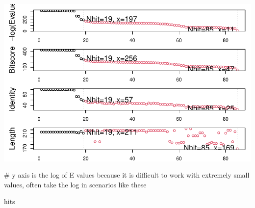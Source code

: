 \documentclass[
  letterpaper,
  DIV=11,
  numbers=noendperiod]{scrartcl}
\newenvironment{Shaded}{\begin{snugshade}}{\end{snugshade}}
\newcommand{\CommentTok}[1]{\textcolor[rgb]{0.37,0.37,0.37}{#1}}
\newcommand{\NormalTok}[1]{\textcolor[rgb]{0.00,0.23,0.31}{#1}}
\begin{document}
\includegraphics{BIMM143-Lab-9-final_files/figure-pdf/unnamed-chunk-26-1.pdf}

\begin{Shaded}
\begin{Highlighting}[]
\CommentTok{\# y axis is the log of E values because it is difficult to work with extremely small values, often take the log in scenarios like these}
\end{Highlighting}
\end{Shaded}

\begin{Shaded}
\begin{Highlighting}[]
\NormalTok{hits}
\end{Highlighting}
\end{Shaded}
\end{document}
